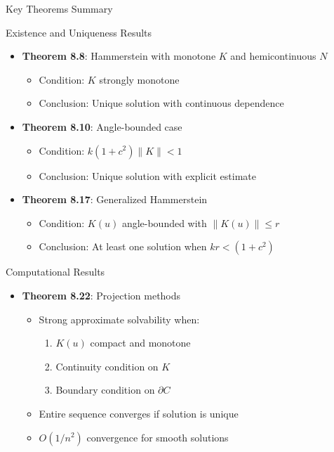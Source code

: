 \documentclass[aspectratio=169,10pt]{beamer}
\begin{document}
\begin{frame}[allowframebreaks]{Key Theorems Summary}
    \begin{block}{Existence and Uniqueness Results}
        \begin{itemize}
            \item \textbf{Theorem 8.8}: Hammerstein with monotone $K$ and hemicontinuous $N$
                \begin{itemize}
                    \item Condition: $K$ strongly monotone
                    \item Conclusion: Unique solution with continuous dependence
                \end{itemize}

            \item \textbf{Theorem 8.10}: Angle-bounded case
                \begin{itemize}
                    \item Condition: $k(1 + c^2)\|K\| < 1$
                    \item Conclusion: Unique solution with explicit estimate
                \end{itemize}

            \item \textbf{Theorem 8.17}: Generalized Hammerstein
                \begin{itemize}
                    \item Condition: $K(u)$ angle-bounded with $\|K(u)\| \leq r$
                    \item Conclusion: At least one solution when $kr < (1 + c^2)$
                \end{itemize}
        \end{itemize}
    \end{block}

    \framebreak

    \begin{block}{Computational Results}
        \begin{itemize}
            \item \textbf{Theorem 8.22}: Projection methods
                \begin{itemize}
                    \item Strong approximate solvability when:
                        \begin{enumerate}
                            \item $K(u)$ compact and monotone
                            \item Continuity condition on $K$
                            \item Boundary condition on $\partial C$
                        \end{enumerate}
                    \item Entire sequence converges if solution is unique
                    \item $O(1/n^2)$ convergence for smooth solutions
                \end{itemize}


\end{itemize}
\end{block}
\end{frame}
\end{document}
